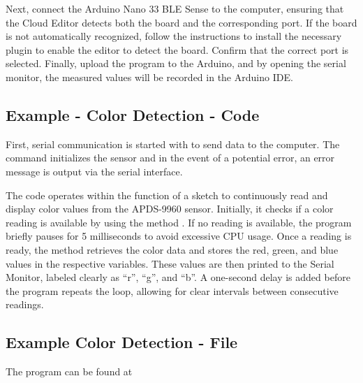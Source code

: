 Next, connect the Arduino Nano 33 BLE Sense to the computer, ensuring that the Cloud Editor detects both the board and the corresponding port. If the board is not automatically recognized, follow the instructions to install the necessary plugin to enable the editor to detect the board. Confirm that the correct port is selected. Finally, upload the program to the Arduino, and by opening the serial monitor, the measured values will be recorded in the Arduino IDE.

\subsection{Example - Color Detection - Code}

First, serial communication is started with  to send data to the computer. The command   initializes the sensor and in the event of a potential error, an error message is output via the serial interface.

\bigskip



\bigskip

The code operates within the function  of a sketch to continuously read and display color values from the APDS-9960 sensor. Initially, it checks if a color reading is available by using the method . If no reading is available, the program briefly pauses for 5 milliseconds to avoid excessive CPU usage. Once a reading is ready, the method  retrieves the color data and stores the red, green, and blue values in the respective variables. These values are then printed to the Serial Monitor, labeled clearly as ``r'', ``g'', and ``b''. A one-second delay is added before the program repeats the loop, allowing for clear intervals between consecutive readings.




\subsection{Example Color Detection - File}

The program can be found at 

\medskip

{
	\label{TestAPDS9960Color}
}



